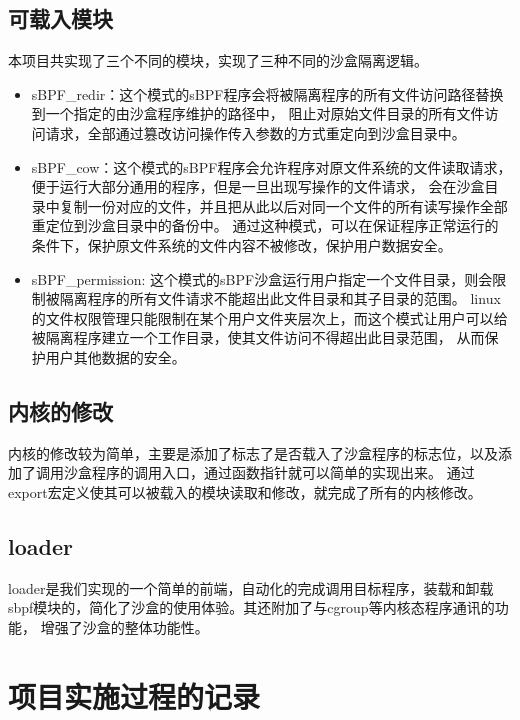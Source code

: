 \documentclass[AutoFakeBold,a4paper]{ctexart}
\begin{document}
\subsection{可载入模块}
本项目共实现了三个不同的模块，实现了三种不同的沙盒隔离逻辑。
\begin{itemize}
    \item {\ttfamily sBPF\_redir}：这个模式的sBPF程序会将被隔离程序的所有文件访问路径替换到一个指定的由沙盒程序维护的路径中，
    阻止对原始文件目录的所有文件访问请求，全部通过篡改访问操作传入参数的方式重定向到沙盒目录中。
    \item {\ttfamily sBPF\_cow}：这个模式的sBPF程序会允许程序对原文件系统的文件读取请求，便于运行大部分通用的程序，但是一旦出现写操作的文件请求，
    会在沙盒目录中复制一份对应的文件，并且把从此以后对同一个文件的所有读写操作全部重定位到沙盒目录中的备份中。
    通过这种模式，可以在保证程序正常运行的条件下，保护原文件系统的文件内容不被修改，保护用户数据安全。
    \item {\ttfamily sBPF\_permission}: 这个模式的sBPF沙盒运行用户指定一个文件目录，则会限制被隔离程序的所有文件请求不能超出此文件目录和其子目录的范围。
    linux的文件权限管理只能限制在某个用户文件夹层次上，而这个模式让用户可以给被隔离程序建立一个工作目录，使其文件访问不得超出此目录范围，
    从而保护用户其他数据的安全。
\end{itemize}


\subsection{内核的修改}
内核的修改较为简单，主要是添加了标志了是否载入了沙盒程序的标志位，以及添加了调用沙盒程序的调用入口，通过函数指针就可以简单的实现出来。
通过export宏定义使其可以被载入的模块读取和修改，就完成了所有的内核修改。

\subsection{loader}
loader是我们实现的一个简单的前端，自动化的完成调用目标程序，装载和卸载sbpf模块的，简化了沙盒的使用体验。其还附加了与cgroup等内核态程序通讯的功能，
增强了沙盒的整体功能性。

\section{项目实施过程的记录}
\end{document}
